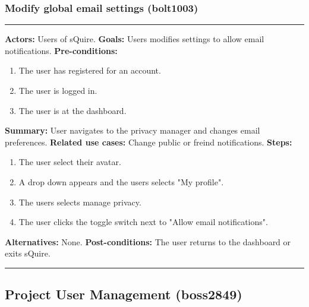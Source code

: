 \documentclass[11pt]{report}
\begin{document}
\subsubsection{Modify global email settings (bolt1003)}
\vspace{2pt}
\hrule
\vspace{8pt}
 \textbf{Actors:} Users of sQuire. \newline
\textbf{Goals:} Users modifies settings to allow email notifications. \newline
 \textbf{Pre-conditions:} \begin{enumerate}
  \item The user has registered for an account.
  \item The user is logged in.
  \item The user is at the dashboard.
 \end{enumerate}
 \textbf{Summary:} User navigates to the privacy manager and changes email preferences.\newline
\textbf{Related use cases:} Change public or freind notifications. \newline
\textbf{Steps:} \begin{enumerate}
  \item The user select their avatar.
  \item A drop down appears and the users selects "My profile".
  \item The users selects manage privacy.
  \item The user clicks the toggle switch next to "Allow email notifications".
 \end{enumerate}
 \textbf{Alternatives:} None. \newline
 \textbf{Post-conditions:} The user returns to the dashboard or exits sQuire. \newline
\vspace{8pt}
\hrule
\newpage

\subsection{Project User Management (boss2849)}
\end{document}
